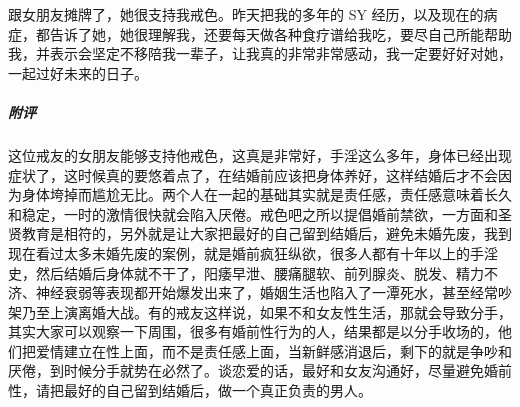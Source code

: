 \begin{case}
    跟女朋友摊牌了，她很支持我戒色。昨天把我的多年的 SY 经历，以及现在的病症，都告诉了她，她很理解我，还要每天做各种食疗谱给我吃，要尽自己所能帮助我，并表示会坚定不移陪我一辈子，让我真的非常非常感动，我一定要好好对她，一起过好未来的日子。
    \subparagraph{附评} 这位戒友的女朋友能够支持他戒色，这真是非常好，手淫这么多年，身体已经出现症状了，这时候真的要悠着点了，在结婚前应该把身体养好，这样结婚后才不会因为身体垮掉而尴尬无比。两个人在一起的基础其实就是责任感，责任感意味着长久和稳定，一时的激情很快就会陷入厌倦。戒色吧之所以提倡婚前禁欲，一方面和圣贤教育是相符的，另外就是让大家把最好的自己留到结婚后，避免未婚先废，我到现在看过太多未婚先废的案例，就是婚前疯狂纵欲，很多人都有十年以上的手淫史，然后结婚后身体就不干了，阳痿早泄、腰痛腿软、前列腺炎、脱发、精力不济、神经衰弱等表现都开始爆发出来了，婚姻生活也陷入了一潭死水，甚至经常吵架乃至上演离婚大战。有的戒友这样说，如果不和女友性生活，那就会导致分手，其实大家可以观察一下周围，很多有婚前性行为的人，结果都是以分手收场的，他们把爱情建立在性上面，而不是责任感上面，当新鲜感消退后，剩下的就是争吵和厌倦，到时候分手就势在必然了。谈恋爱的话，最好和女友沟通好，尽量避免婚前性，请把最好的自己留到结婚后，做一个真正负责的男人。
\end{case}

